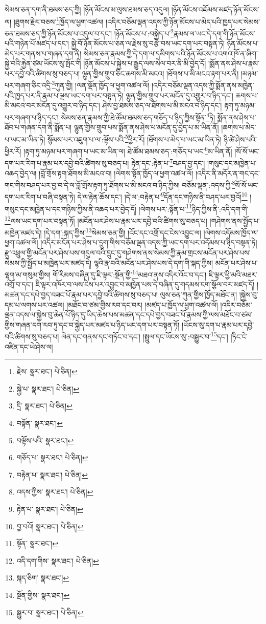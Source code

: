 སེམས་ཅན་དག་ནི་ཐམས་ཅད་ཀྱི། །ཉོན་མོངས་མ་ལུས་ཐམས་ཅད་འདུལ། །ཉོན་མོངས་འཇོམས་མཛད་ཉོན་མོངས་ལ། །ཐུགས་རྗེར་བཅས་\footnote{རྗེས་  སྣར་ཐང་།  པེ་ཅིན། }ཁྱོད་ལ་ཕྱག་འཚལ། །འདིར་བཅོམ་ལྡན་འདས་ཀྱི་ཉོན་མོངས་པ་མེད་པའི་ཁྱད་པར་སེམས་ཅན་ཐམས་ཅད་ཀྱི་ཉོན་མོངས་པ་འདུལ་བ་དང་། །ཉོན་མོངས་པ་:བསྐྱེད་པ་\footnote{སྐྱེ་པ་  སྣར་ཐང་།  པེ་ཅིན། }རྣམས་ལ་ཡང་དེ་དག་གི་ཉོན་མོངས་པའི་གཉེན་པོ་མཛད་པ་དང་། སྐྱེ་བོ་ཉོན་མོངས་པ་ཅན་ལ་རྗེས་སུ་བརྩེ་བས་ཡང་དག་པར་བསྟན་ཏེ། ཉོན་མོངས་པ་མེད་པར་གནས་པ་གཞན་དག་ནི། སེམས་ཅན་རྣམས་ཀྱི་དེ་དག་ལ་དམིགས་པའི་ཉོན་མོངས་པ་འགའ་ཁོ་ན་ཞིག་སྐྱེ་བའི་རྐྱེན་ཙམ་ཡོངས་སུ་སྤོང་གི །ཉོན་མོངས་པ་སྐྱེས་པ་རྒྱུད་ལས་སེལ་བར་ནི་མི་བྱེད་དོ། །སྨོན་ནས་ཤེས་པ་རྣམ་པར་དབྱེ་བའི་ཚིགས་སུ་བཅད་པ། ལྷུན་གྱིས་གྲུབ་ཅིང་ཆགས་མི་མངའ། །ཐོགས་པ་མི་མངའ་རྟག་པར་ནི། །མཉམ་པར་གཞག་ཅིང་འདྲི་\footnote{དྲི་  སྣར་ཐང་།  པེ་ཅིན། }ཀུན་གྱི། །ལན་ལྡོན་ཁྱོད་ལ་ཕྱག་འཚལ་ལོ། །འདིར་བཅོམ་ལྡན་འདས་ཀྱི་སྨོན་ནས་མཁྱེན་པའི་ཁྱད་པར་ནི་རྣམ་པ་ལྔས་ཡང་དག་པར་བསྟན་ཏེ། ལྷུན་གྱིས་གྲུབ་པར་མངོན་དུ་འགྱུར་བ་ཉིད་དང་། ཆགས་པ་མི་མངའ་བར་མངོན་དུ་འགྱུར་བ་ཉིད་དང་། ཤེས་བྱ་ཐམས་ཅད་ལ་ཐོགས་པ་མི་མངའ་བ་ཉིད་དང་། རྟག་ཏུ་མཉམ་པར་གཞག་པ་ཉིད་དང་། སེམས་ཅན་རྣམས་ཀྱི་ཐེ་ཚོམ་ཐམས་ཅད་གཅོད་པ་ཉིད་ཀྱིས་སྟོན་\footnote{བསྟོན་  སྣར་ཐང་། }ཏེ། སྨོན་ནས་ཤེས་པ་ཐོབ་པ་གཞན་དག་ནི་སྨོན་པ། ལྷུན་གྱིས་གྲུབ་པས་སྨོན་ནས་ཤེས་པ་མངོན་དུ་བྱེད་པ་མ་ཡིན་ནོ། །ཆགས་པ་མེད་པ་ཡང་མ་ཡིན་ཏེ། སྙོམས་པར་འཇུག་པ་ལ་:ལྟོས་པའི་\footnote{བལྟོས་པའི་  སྣར་ཐང་། }ཕྱིར་རོ། །ཐོགས་པ་མེད་པ་ཡང་མ་ཡིན་ཏེ། ཉི་ཚེ་ཤེས་པའི་ཕྱིར་རོ། །རྟག་ཏུ་མཉམ་པར་གཞག་པ་ཡང་མ་ཡིན་ལ། ཐེ་ཚོམ་ཐམས་ཅད་:གཅོད་པ་ཡང་\footnote{གཅོད་པ་  སྣར་ཐང་།  པེ་ཅིན། }མ་ཡིན་ནོ། །སོ་སོ་ཡང་དག་པར་རིག་པ་རྣམ་པར་དབྱེ་བའི་ཚིགས་སུ་བཅད་པ། རྟེན་དང་:རྟེན་པ་\footnote{བརྟེན་པ་  སྣར་ཐང་།  པེ་ཅིན། }བཤད་བྱ་དང་། །གསུང་དང་མཁྱེན་པ་འཆད་བྱེད་ལ། །བློ་གྲོས་རྟག་ཐོགས་མི་མངའ་བ། །ལེགས་སྟོན་ཁྱོད་ལ་ཕྱག་འཚལ་ལོ། །འདིར་ནི་མདོར་ན་གང་དང་གང་གིས་བཤད་པར་བྱ་བ་དེ་ལ་བློ་གྲོས་རྟག་ཏུ་ཐོགས་པ་མི་མངའ་བ་ཉིད་ཀྱིས། བཅོམ་ལྡན་:འདས་ཀྱི་\footnote{འདས་ཀྱིས་  སྣར་ཐང་།  པེ་ཅིན། }སོ་སོ་ཡང་དག་པར་རིག་པ་བཞི་བསྟན་ཏེ། དེ་ལ་རྟེན་ཆོས་དང་། །དེ་ལ་:བརྟེན་པ་\footnote{རྟེན་པ་  སྣར་ཐང་།  པེ་ཅིན། }དོན་དང་གཉིས་ནི་བཤད་པར་བྱའོ།\footnote{བྱ་བའོ།  སྣར་ཐང་།  པེ་ཅིན། } །གསུང་དང་མཁྱེན་པ་དང་གཉིས་ཀྱིས་ནི་འཆད་པར་བྱེད་དོ། །ལེགས་པར་:སྟོན་པ་\footnote{སྟོན་  སྣར་ཐང་། }ཉིད་ཀྱིས་ནི་:འདི་དག་གི་\footnote{འདི་དག་གིས་  སྣར་ཐང་།  པེ་ཅིན། }ལས་ཡང་དག་པར་བསྟན་ཏོ། །མངོན་པར་ཤེས་པ་རྣམ་པར་དབྱེ་བའི་ཚིགས་སུ་བཅད་པ། །གཤེགས་ནས་སྤྱོད་པ་མཁྱེན་མཛད་དེ། །དེ་དག་:སྐད་ཀྱིས་\footnote{སྐད་ཅིག་  སྣར་ཐང་། }སེམས་ཅན་གྱི། །འོང་དང་འགྲོ་དང་ངེས་འབྱུང་ལ། །ལེགས་འདོམས་ཁྱོད་ལ་ཕྱག་འཚལ་ལོ། །འདིར་མངོན་པར་ཤེས་པ་དྲུག་གིས་བཅོམ་ལྡན་འདས་ཀྱི་ཡང་དག་པར་འདོམས་པ་ཉིད་བསྟན་ཏེ། རྫུ་འཕྲུལ་གྱི་མངོན་པར་ཤེས་པས་གདུལ་བའི་དྲུང་དུ་གཤེགས་ནས་སེམས་ཀྱི་རྣམ་གྲངས་མངོན་པར་ཤེས་པས་སེམས་ཀྱི་སྤྱོད་པ་མཁྱེན་པར་མཛད་དེ། ལྷའི་རྣ་བའི་མངོན་པར་ཤེས་པས་དེ་དག་གི་སྐད་ཀྱིས། མངོན་པར་ཤེས་པ་ལྷག་མ་གསུམ་གྱིས། གོ་རིམས་བཞིན་དུ་ཇི་ལྟར་:སྔོན་གྱི་\footnote{སྔོན་གྱིས་  སྣར་ཐང་། }མཐའ་ནས་འདིར་འོང་བ་དང་། ཇི་ལྟར་ཕྱི་མའི་མཐར་འགྲོ་བ་དང་། ཇི་ལྟར་འཁོར་བ་ལས་ངེས་པར་འབྱུང་བ་མཁྱེན་པས་དེ་བཞིན་དུ་གདམས་ངག་སྩོལ་བར་མཛད་དོ། །མཚན་དང་དཔེ་བྱད་བཟང་པོ་རྣམ་པར་དབྱེ་བའི་ཚིགས་སུ་བཅད་པ། ལུས་ཅན་ཀུན་གྱིས་ཁྱོད་མཐོང་ན། །སྐྱེས་བུ་དམ་པ་ལགས་པར་འཚལ། །མཐོང་བ་ཙམ་གྱིས་རབ་དང་བར། །མཛད་པ་ཁྱོད་ལ་ཕྱག་འཚལ་ལོ། །འདིར་བཅོམ་ལྡན་འདས་ལ་སྐྱེས་བུ་ཆེན་པོ་ཉིད་དུ་ཡིད་ཆེས་པས་མཚན་དང་དཔེ་བྱད་བཟང་པོ་རྣམས་ཀྱི་ལས་མཐོང་བ་ཙམ་གྱིས་གཞན་དག་རབ་ཏུ་དང་བ་སྐྱེད་པར་མཛད་པ་ཉིད་ཡང་དག་པར་བསྟན་ཏོ། །ཡོངས་སུ་དག་པ་རྣམ་པར་དབྱེ་བའི་ཚིགས་སུ་བཅད་པ། ལེན་དང་གནས་དང་གཏོང་བ་དང་། །སྤྲུལ་དང་ཡོངས་སུ་:བསྒྱུར་བ་\footnote{སྒྱུར་བ་  སྣར་ཐང་།  པེ་ཅིན། }དང་། །ཏིང་ངེ་འཛིན་དང་ཡེ་ཤེས་ལ། 